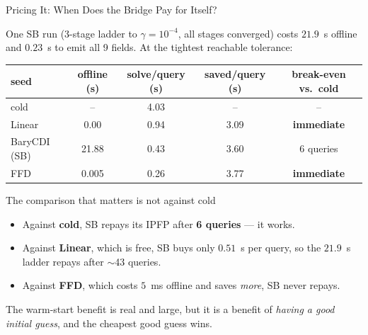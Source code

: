 \documentclass[aspectratio=169]{beamer}
\newcommand{\lose}[1]{\textcolor{red!75!black}{#1}}
\begin{document}
\begin{frame}{Pricing It: When Does the Bridge Pay for Itself?}

\footnotesize
One SB run (3-stage ladder to $\gamma=10^{-4}$, all stages converged) costs
$21.9$~s offline and $0.23$~s to emit all 9 fields. At the tightest reachable
tolerance:

\begin{center}
\begin{tabular}{@{}lcccc@{}}
\toprule
seed & offline (s) & solve/query (s) & saved/query (s) & break-even vs.\ cold \\
\midrule
cold              & --     & 4.03 & --   & -- \\
Linear            & 0.00   & 0.94 & 3.09 & \textbf{immediate} \\
BaryCDI (SB)      & 21.88  & 0.43 & 3.60 & 6 queries \\
FFD               & 0.005  & 0.26 & 3.77 & \textbf{immediate} \\
\bottomrule
\end{tabular}
\end{center}

\begin{alertblock}{The comparison that matters is not against cold}
\begin{itemize}\small
    \item Against \textbf{cold}, SB repays its IPFP after \textbf{6 queries} — it works.
    \item Against \textbf{Linear}, which is free, SB buys only $0.51$~s per query,
          so the $21.9$~s ladder repays after \lose{$\sim$43 queries}.
    \item Against \textbf{FFD}, which costs $5$~ms offline and saves \emph{more},
          SB \lose{never} repays.
\end{itemize}
\end{alertblock}

\small The warm-start benefit is real and large, but it is a benefit of
\emph{having a good initial guess}, and the cheapest good guess wins.

\end{frame}
\end{document}
